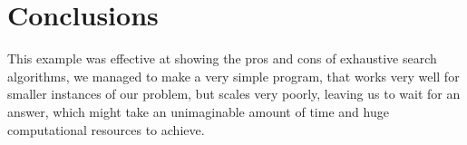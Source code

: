 \documentclass[...]{revdetua}
\begin{document}
\section{Conclusions}
This example was effective at showing the pros and cons of exhaustive search algorithms, we managed to make a very simple program, that works very well for smaller instances of our problem, but scales very poorly, leaving us to wait for an answer, which might take an unimaginable amount of time and huge computational resources to achieve.

\end{document}
